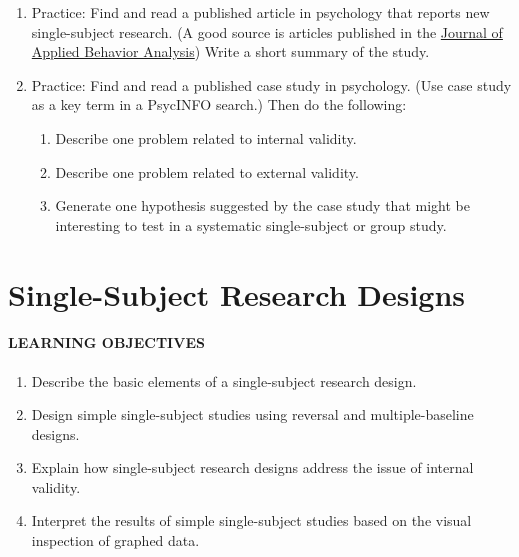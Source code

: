 \documentclass[
]{krantz}
\providecommand{\tightlist}{%
  \setlength{\itemsep}{0pt}\setlength{\parskip}{0pt}}
\begin{document}
\begin{enumerate}
\def\labelenumi{\arabic{enumi}.}
\tightlist
\item
  Practice: Find and read a published article in psychology that reports new single-subject research. (A good source is articles published in the \href{https://onlinelibrary.wiley.com/journal/19383703}{Journal of Applied Behavior Analysis}) Write a short summary of the study.
\item
  Practice: Find and read a published case study in psychology. (Use case study as a key term in a PsycINFO search.) Then do the following:

  \begin{enumerate}
  \def\labelenumii{\alph{enumii}.}
  \tightlist
  \item
    Describe one problem related to internal validity.
  \item
    Describe one problem related to external validity.
  \item
    Generate one hypothesis suggested by the case study that might be interesting to test in a systematic single-subject or group study.
  \end{enumerate}
\end{enumerate}

\hypertarget{single-subject-research-designs}{%
\section{Single-Subject Research Designs}\label{single-subject-research-designs}}

\hypertarget{learning-objectives-28}{%
\paragraph*{LEARNING OBJECTIVES}\label{learning-objectives-28}}

\begin{enumerate}
\def\labelenumi{\arabic{enumi}.}
\tightlist
\item
  Describe the basic elements of a single-subject research design.
\item
  Design simple single-subject studies using reversal and multiple-baseline designs.
\item
  Explain how single-subject research designs address the issue of internal validity.
\item
  Interpret the results of simple single-subject studies based on the visual inspection of graphed data.
\end{enumerate}
\end{document}
